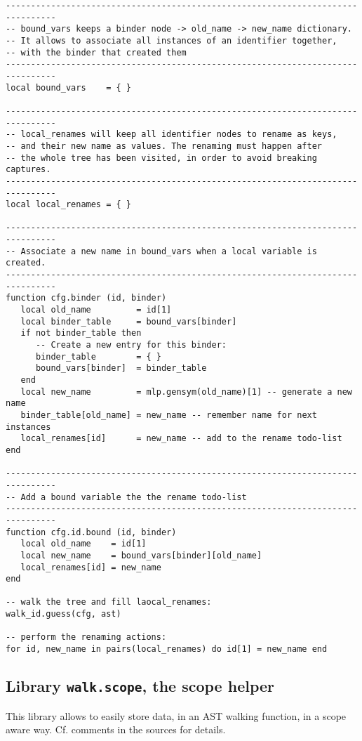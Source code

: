 \begin{verbatim}
--------------------------------------------------------------------------------
-- bound_vars keeps a binder node -> old_name -> new_name dictionary.
-- It allows to associate all instances of an identifier together,
-- with the binder that created them
--------------------------------------------------------------------------------
local bound_vars    = { }

--------------------------------------------------------------------------------
-- local_renames will keep all identifier nodes to rename as keys,
-- and their new name as values. The renaming must happen after 
-- the whole tree has been visited, in order to avoid breaking captures.
--------------------------------------------------------------------------------
local local_renames = { }

--------------------------------------------------------------------------------
-- Associate a new name in bound_vars when a local variable is created.
--------------------------------------------------------------------------------
function cfg.binder (id, binder)
   local old_name         = id[1]
   local binder_table     = bound_vars[binder]
   if not binder_table then
      -- Create a new entry for this binder:
      binder_table        = { }
      bound_vars[binder]  = binder_table
   end
   local new_name         = mlp.gensym(old_name)[1] -- generate a new name
   binder_table[old_name] = new_name -- remember name for next instances
   local_renames[id]      = new_name -- add to the rename todo-list
end

--------------------------------------------------------------------------------
-- Add a bound variable the the rename todo-list
--------------------------------------------------------------------------------
function cfg.id.bound (id, binder)
   local old_name    = id[1]
   local new_name    = bound_vars[binder][old_name]
   local_renames[id] = new_name
end

-- walk the tree and fill laocal_renames:
walk_id.guess(cfg, ast)

-- perform the renaming actions:
for id, new_name in pairs(local_renames) do id[1] = new_name end
\end{verbatim}

\subsection{Library {\tt walk.scope}, the scope helper}
This library allows to easily store data, in an AST walking function, in a scope
aware way. Cf. comments in the sources for details.
